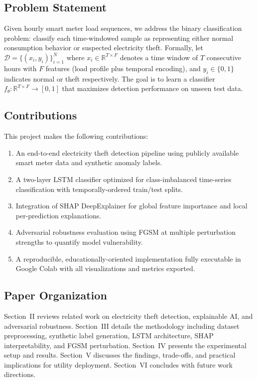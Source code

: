 \documentclass[journal]{IEEEtran}
\begin{document}
\subsection{Problem Statement}
Given hourly smart meter load sequences, we address the binary classification problem: classify each time-windowed sample as representing either normal consumption behavior or suspected electricity theft. Formally, let $\mathcal{D} = \{(x_i, y_i)\}_{i=1}^{N}$ where $x_i \in \mathbb{R}^{T \times F}$ denotes a time window of $T$ consecutive hours with $F$ features (load profile plus temporal encoding), and $y_i \in \{0, 1\}$ indicates normal or theft respectively. The goal is to learn a classifier $f_\theta: \mathbb{R}^{T \times F} \rightarrow [0, 1]$ that maximizes detection performance on unseen test data.

\subsection{Contributions}
This project makes the following contributions:
\begin{enumerate}
    \item An end-to-end electricity theft detection pipeline using publicly available smart meter data and synthetic anomaly labels.
    \item A two-layer LSTM classifier optimized for class-imbalanced time-series classification with temporally-ordered train/test splits.
    \item Integration of SHAP DeepExplainer for global feature importance and local per-prediction explanations.
    \item Adversarial robustness evaluation using FGSM at multiple perturbation strengths to quantify model vulnerability.
    \item A reproducible, educationally-oriented implementation fully executable in Google Colab with all visualizations and metrics exported.
\end{enumerate}

\subsection{Paper Organization}
Section~II reviews related work on electricity theft detection, explainable AI, and adversarial robustness. Section~III details the methodology including dataset preprocessing, synthetic label generation, LSTM architecture, SHAP interpretability, and FGSM perturbation. Section~IV presents the experimental setup and results. Section~V discusses the findings, trade-offs, and practical implications for utility deployment. Section~VI concludes with future work directions.
\end{document}
